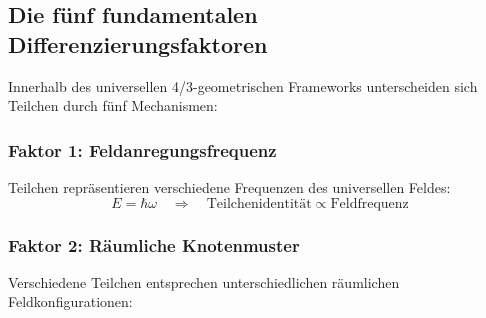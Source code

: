	\subsection{Die fünf fundamentalen Differenzierungsfaktoren}
	\label{subsec:fuenf_faktoren}
	
	Innerhalb des universellen 4/3-geometrischen Frameworks unterscheiden sich Teilchen durch fünf Mechanismen:
	
	\subsubsection{Faktor 1: Feldanregungsfrequenz}
	\label{subsubsec:anregungsfrequenz}
	
	Teilchen repräsentieren verschiedene Frequenzen des universellen Feldes:
	\begin{equation}
		E = \hbar \omega \quad \Rightarrow \quad \text{Teilchenidentität} \propto \text{Feldfrequenz}
		\label{eq:frequenz_identitaet}
	\end{equation}
	
	\begin{table}[htbp]
		\centering
		\caption{Teilchenklassifikation nach Feldfrequenz}
		\label{tab:frequenz_klassifikation}
	\end{table}
	
	\subsubsection{Faktor 2: Räumliche Knotenmuster}
	\label{subsubsec:raeumliche_muster}
	
	Verschiedene Teilchen entsprechen unterschiedlichen räumlichen Feldkonfigurationen:
	

